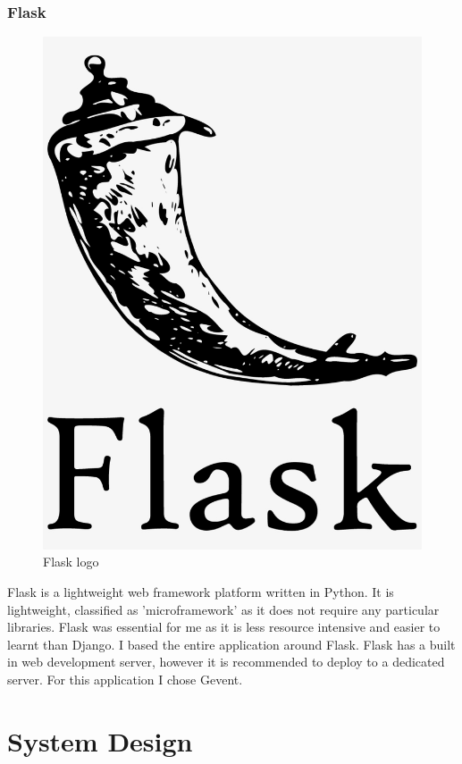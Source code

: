 \subsection{Flask}
\begin{figure}[!htbp] 
    \centering
    \includegraphics[scale = 0.35]{img/flaskLogo.png}
    \caption{Flask logo}
    \label{fig:my_label}
\end{figure}
Flask is a lightweight web framework platform written in Python. It is lightweight, classified as 'microframework' as it does not require any particular libraries. Flask was essential for me as it is less resource intensive and easier to learnt than Django. I based the entire application around Flask. Flask has a built in web development server, however it is recommended to deploy to a dedicated server. For this application I chose Gevent.~\cite{flaskDeploy}
\chapter{System Design}
